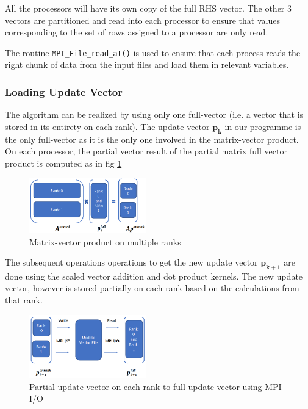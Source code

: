 \documentclass[sigplan,screen]{acmart}
\begin{document}
All the processors will have its own copy of the full RHS vector. The other 3 vectors are partitioned and read into each processor to ensure that values corresponding to the set of rows assigned to a processor are only read. 

The routine \texttt{MPI\_File\_read\_at()} is used to ensure that each process reads the right chunk of data from the input files and load them in relevant variables.

\subsubsection{Loading Update Vector}
The algorithm can be realized by using only one full-vector (i.e. a vector that is stored in its entirety on each rank). The update vector $\mathbf{p_k}$ in our programme is the only full-vector as it is the only one involved in the matrix-vector product. On each processor, the partial vector result of the partial matrix full vector product is computed as in fig \ref{fig2}
\begin{figure}[H]
	\begin{center}
		\includegraphics[width=0.45\textwidth]{plots/mpio_Ap.png}
	\end{center}
	\caption{Matrix-vector product on multiple ranks}
	\label{fig2} 
\end{figure}
The subsequent operations operations to get the new update vector $\mathbf{p_{k+1}}$ are done using the scaled vector addition and dot product kernels. The new update vector, however is stored partially on each rank based on the calculations from that rank.
\begin{figure}[H]
	\begin{center}
		\includegraphics[width=0.45\textwidth]{plots/mpio_pupdate.png}
	\end{center}
	\caption{Partial update vector on each rank to full update vector using MPI I/O}
	\label{fig3} 
\end{figure}
\end{document}
